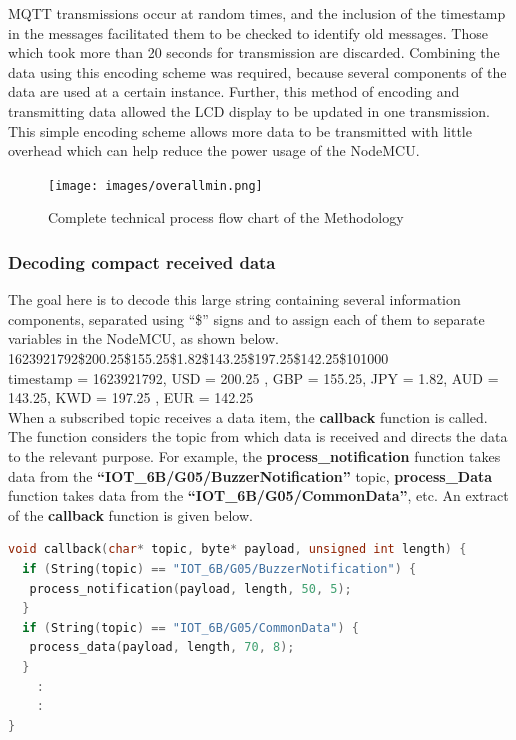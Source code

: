 MQTT transmissions occur at random times, and the inclusion of the timestamp in the messages facilitated them to be checked to identify old messages. Those which took more than 20 seconds for transmission are discarded. Combining the data using this encoding scheme was required, because several components of the data are used at a certain instance. Further, this method of encoding and transmitting data allowed the LCD display to be updated in one transmission.\\

This simple encoding scheme allows more data to be transmitted with little overhead which can help reduce the power usage of the NodeMCU.

\newpage

\begin{figure}[H]
    \centering
      \texttt{[image: images/overallmin.png]}
    \caption{Complete technical process flow chart of the Methodology}
    \label{fig:overall}
\end{figure}

\newpage

\subsubsection{Decoding compact received data}

The goal here is to decode this large string containing several information components, separated using “\$” signs and to assign each of them to separate variables in the NodeMCU, as shown below. \\


1623921792\$200.25\$155.25\$1.82\$143.25\$197.25\$142.25\$101000\\


timestamp = 1623921792, USD = 200.25 , GBP = 155.25, JPY = 1.82, AUD = 143.25, KWD = 197.25 , EUR = 142.25\\

When a subscribed topic receives a data item, the \textbf{callback} function is called. The function considers the topic from which data is received and directs the data to the relevant purpose. For example, the \textbf{process\_notification}  function takes data from the \textbf{“IOT\_6B/G05/BuzzerNotification”} topic, \textbf{process\_Data} function takes data from the \textbf{“IOT\_6B/G05/CommonData”}, etc. An extract of the \textbf{callback} function is given below.\\

\begin{lstlisting}[language=C++]
void callback(char* topic, byte* payload, unsigned int length) {
  if (String(topic) == "IOT_6B/G05/BuzzerNotification") {
   process_notification(payload, length, 50, 5);
  }
  if (String(topic) == "IOT_6B/G05/CommonData") {
   process_data(payload, length, 70, 8);
  }
	:
	:
}
\end{lstlisting}

